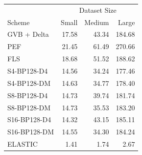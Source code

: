 \begin{tabular}{lrrr}
\toprule
 & \multicolumn{3}{c}{Dataset Size} \\
Scheme & Small & Medium & Large \\
\midrule
GVB + Delta & 17.58 & 43.34 & 184.68 \\
PEF & 21.45 & 61.49 & 270.66 \\
FLS & 18.68 & 51.52 & 188.62 \\
S4-BP128-D4 & 14.56 & 34.24 & 177.46 \\
S4-BP128-DM & 14.63 & 34.77 & 178.40 \\
S8-BP128-D4 & 14.73 & 39.74 & 181.74 \\
S8-BP128-DM & 14.73 & 35.53 & 183.20 \\
S16-BP128-D4 & 14.32 & 43.15 & 185.11 \\
S16-BP128-DM & 14.55 & 34.30 & 184.24 \\
ELASTIC & 1.41 & 1.74 & 2.67 \\
\bottomrule
\end{tabular}

